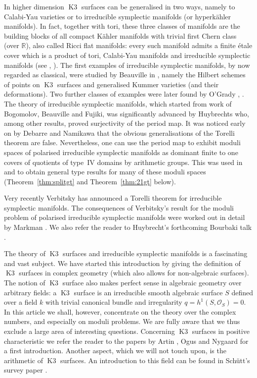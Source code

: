 \documentclass[a4paper,11pt]{article}
\newcommand{\RR}{\mathbb R}
\newcommand{\cO}{\mathcal O}
\newcommand{\Kthree}{\mathop{\mathrm {K3}}\nolimits}
\begin{document}
In higher dimension $\Kthree$ surfaces can be generalised in two ways,
namely to Calabi-Yau varieties or to irreducible symplectic manifolds
(or hyperk\"ahler manifolds). In fact, together with tori, these three
classes of manifolds are the building blocks of all compact K\"ahler
manifolds with trivial first Chern class (over $\RR$), also called
Ricci flat manifolds: every such manifold admits a finite \'etale cover which
is a product of tori, Calabi-Yau manifolds and irreducible symplectic
manifolds (see \cite{Be}, \cite{Bog2}).  The first examples of
irreducible symplectic manifolds, by now regarded as classical, were
studied by Beauville in \cite{Be}, namely the Hilbert schemes of
points on $\Kthree$ surfaces and generalised Kummer varieties (and
their deformations). Two further classes of examples were later found
by O'Grady \cite{OG1}, \cite{OG2}.  The theory of irreducible
symplectic manifolds, which started from work of Bogomolov,
Beauville and Fujiki, was significantly advanced by Huybrechts \cite{Huy1} who,
among other results, proved surjectivity of the period map. It was
noticed early on by Debarre \cite{Deb} and Namikawa \cite{Nam} that
the obvious generalisations of the Torelli theorem are
false. Nevertheless, one can use the period map to exhibit moduli
spaces of polarised irreducible symplectic manifolds as dominant
finite to one covers of quotients of type~IV domains by arithmetic
groups. This was used in \cite{GHSsymp} and \cite{GHSdim21} to obtain
general type results for many of these moduli spaces
(Theorem~\ref{thm:splitgt} and Theorem~\ref{thm:21gt} below).

Very recently Verbitsky \cite{Ver} has announced a Torelli theorem for
irreducible symplectic manifolds.  The consequences of Verbitsky's
result for the moduli problem of polarised irreducible symplectic
manifolds were worked out in detail by Markman \cite{Mar4}. We also refer
the reader to Huybrecht's forthcoming Bourbaki talk \cite{Huy2}.

The theory of $\Kthree$ surfaces and irreducible symplectic manifolds
is a fascinating and vast subject.  We have started this introduction
by giving the definition of $\Kthree$ surfaces in complex geometry
(which also allows for non-algebraic surfaces).  The notion of
$\Kthree$ surface also makes perfect sense in algebraic geometry over
arbitrary fields: a $\Kthree$ surface is an irreducible smooth
algebraic surface $S$ defined over a field $k$ with trivial canonical
bundle and irregularity $q=h^1(S,\cO_S)=0$.  In this article we shall,
however, concentrate on the theory over the complex numbers, and
especially on moduli problems.  We are fully aware that we thus
exclude a large area of interesting questions.  Concerning $\Kthree$
surfaces in positive characteristic we refer the reader to the papers
by Artin \cite{Ar}, Ogus \cite{Og} and Nygaard \cite{Ny} for a first
introduction.  Another aspect, which we will not touch upon, is the
arithmetic of $\Kthree$ surfaces.  An introduction to this field can
be found in Sch\"utt's survey paper \cite{Sch}.
\end{document}

